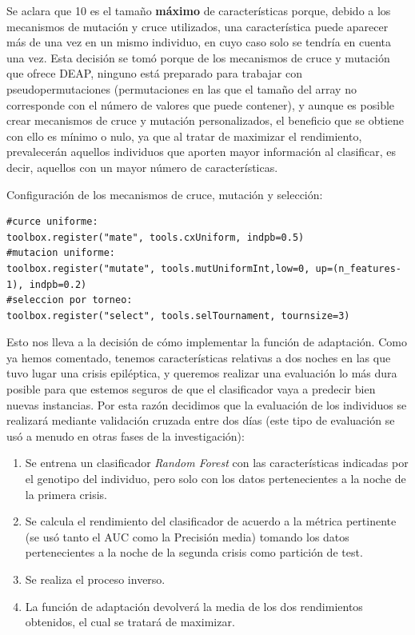 Se aclara que 10 es el tamaño \textbf{máximo} de características porque, debido a los mecanismos de mutación y cruce utilizados, una característica puede aparecer más de una vez en un mismo individuo, en cuyo caso solo se tendría en cuenta una vez. Esta decisión se tomó porque de los mecanismos de cruce y mutación que ofrece DEAP, ninguno está preparado para trabajar con pseudopermutaciones (permutaciones en las que el tamaño del array no corresponde con el número de valores que puede contener), y aunque es posible crear mecanismos de cruce y mutación personalizados, el beneficio que se obtiene con ello es mínimo o nulo, ya que al tratar de maximizar el rendimiento, prevalecerán aquellos individuos que aporten mayor información al clasificar, es decir, aquellos con un mayor número de características.

Configuración de los mecanismos de cruce, mutación y selección:

\begin{minipage}{0.95\linewidth} 
\begin{lstlisting}
#curce uniforme:
toolbox.register("mate", tools.cxUniform, indpb=0.5)
#mutacion uniforme:
toolbox.register("mutate", tools.mutUniformInt,low=0, up=(n_features-1), indpb=0.2)
#seleccion por torneo:
toolbox.register("select", tools.selTournament, tournsize=3)
\end{lstlisting}
\end{minipage}

Esto nos lleva a la decisión de cómo implementar la función de adaptación. Como ya hemos comentado, tenemos características relativas a dos noches en las que tuvo lugar una crisis epiléptica, y queremos realizar una evaluación lo más dura posible para que estemos seguros de que el clasificador vaya a predecir bien nuevas instancias. Por esta razón decidimos que la evaluación de los individuos se realizará mediante validación cruzada entre dos días (este tipo de evaluación se usó a menudo en otras fases de la investigación): 

\begin{minipage}{\linewidth}
\begin{enumerate}
	\item Se entrena un clasificador \textit{Random Forest} con las características indicadas por el genotipo del individuo, pero solo con los datos pertenecientes a la noche de la primera crisis. 
	\item Se calcula el rendimiento del clasificador de acuerdo a la métrica pertinente (se usó tanto el AUC como la Precisión media) tomando los datos pertenecientes a la noche de la segunda crisis como partición de test. 
	\item Se realiza el proceso inverso. 
	\item La función de adaptación devolverá la media de los dos rendimientos obtenidos, el cual se tratará de maximizar. 
\end{enumerate}
\end{minipage}

